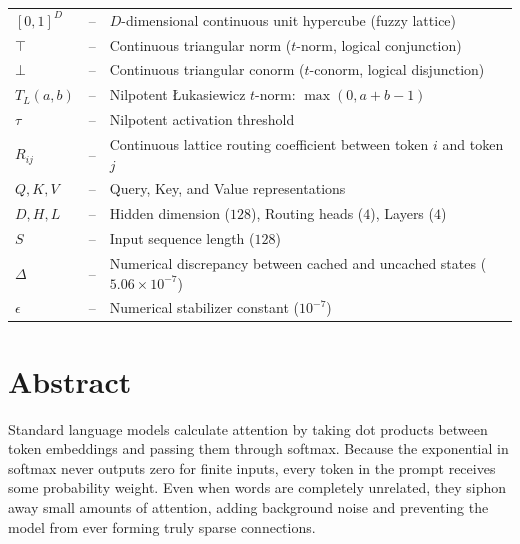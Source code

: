 \documentclass[a4paper, 12pt]{report}
\theoremstyle{definition}
\begin{document}
\noindent
\setlength{\tabcolsep}{5pt}
\begin{tabular}{p{2.5cm}cp{11.5cm}}
$[0, 1]^D$ &--& $D$-dimensional continuous unit hypercube (fuzzy lattice) \\
$\top$ &--& Continuous triangular norm ($t$-norm, logical conjunction) \\
$\bot$ &--& Continuous triangular conorm ($t$-conorm, logical disjunction) \\
$T_L(a, b)$ &--& Nilpotent \L{}ukasiewicz $t$-norm: $\max(0, a+b-1)$ \\
$\tau$ &--& Nilpotent activation threshold \\
$R_{ij}$ &--& Continuous lattice routing coefficient between token $i$ and token $j$ \\
$Q, K, V$ &--& Query, Key, and Value representations \\
$D, H, L$ &--& Hidden dimension ($128$), Routing heads ($4$), Layers ($4$) \\
$S$ &--& Input sequence length ($128$) \\
$\Delta$ &--& Numerical discrepancy between cached and uncached states ($5.06 \times 10^{-7}$) \\
$\epsilon$ &--& Numerical stabilizer constant ($10^{-7}$) \\
\end{tabular}

	\clearpage
	\chapter*{Abstract}
	Standard language models calculate attention by taking dot products between token embeddings and passing them through softmax. Because the exponential in softmax never outputs zero for finite inputs, every token in the prompt receives some probability weight. Even when words are completely unrelated, they siphon away small amounts of attention, adding background noise and preventing the model from ever forming truly sparse connections.
\end{document}
